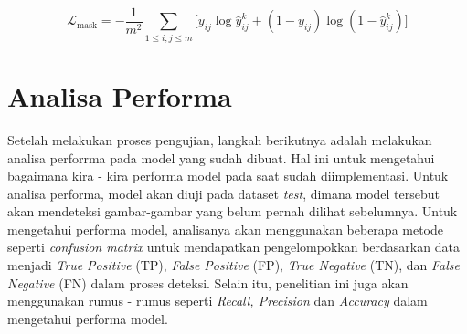 \begin{equation}
  \label{eq :mask loss}
  \mathcal{L}_\text{mask} = - \frac{1}{m^2} \sum_{1 \leq i, j \leq m} \big[ y_{ij} \log \hat{y}^k_{ij} + (1-y_{ij}) \log (1- \hat{y}^k_{ij}) \big]
\end{equation}

\section{Analisa Performa}
Setelah melakukan proses pengujian, langkah berikutnya adalah melakukan analisa perforrma pada model yang 
sudah dibuat. Hal ini untuk mengetahui bagaimana kira - kira performa model pada saat sudah diimplementasi. 
Untuk analisa performa, model akan diuji pada dataset \textit{test}, dimana model tersebut akan mendeteksi
gambar-gambar yang belum pernah dilihat sebelumnya. Untuk mengetahui performa model, 
analisanya akan menggunakan beberapa metode seperti \textit{confusion matrix} untuk mendapatkan
pengelompokkan berdasarkan data menjadi \textit{True Positive} (TP), \textit{False Positive} (FP), 
\textit{True Negative} (TN), dan \textit{False Negative} (FN) dalam proses deteksi.
Selain itu, penelitian ini juga akan menggunakan rumus - rumus seperti \textit{Recall, Precision} dan 
\textit{Accuracy} dalam mengetahui performa model.






